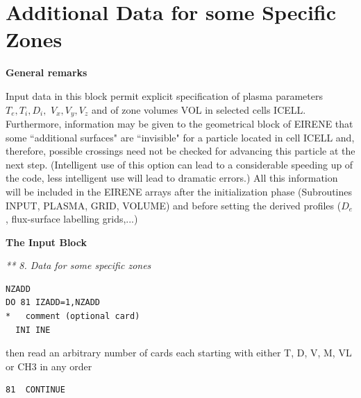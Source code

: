 \newpage
\section{Additional Data for some Specific Zones} \label{sec2.8}

\medskip

\noindent %

{\bf General remarks}

\medskip

\noindent

Input data in this block permit explicit specification of plasma
parameters $T_e , T_i , D_i,$ $ V_x , V_y , V_z$ and of zone
volumes VOL in selected cells ICELL. Furthermore, information may
be given to the geometrical block of EIRENE that some ``additional
surfaces" are ``invisible" for a particle located in cell ICELL
and, therefore, possible crossings need not be checked for
advancing this particle at the next step. (Intelligent use of this
option can lead to a considerable speeding up of the code, less
intelligent use will lead to dramatic errors.) All this
information will be included in the EIRENE arrays after the
initialization phase (Subroutines INPUT, PLASMA, GRID, VOLUME) and
before setting the derived profiles ($D_e$, flux-surface labelling
grids,...)

\medskip

\noindent

{\bf The Input Block}

\medskip

\noindent

{\sl *** 8. Data for some specific zones}
\begin{verbatim}
NZADD
DO 81 IZADD=1,NZADD
*   comment (optional card)
  INI INE
\end{verbatim}
then read an arbitrary number of cards
each starting with either T, D, V, M, VL or CH3 in
any order

\begin{verbatim}
81  CONTINUE
\end{verbatim}

